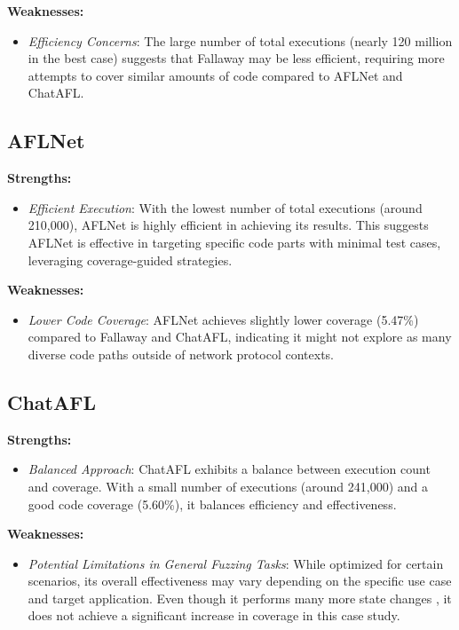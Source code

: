 \textbf{Weaknesses:}
\begin{itemize}
    \item \textit{Efficiency Concerns}: The large number of total executions (nearly 120 million in the best case) suggests that Fallaway may be less efficient, requiring more attempts to cover similar amounts of code compared to AFLNet and ChatAFL.
\end{itemize}


\subsection{AFLNet}

\textbf{Strengths:}
\begin{itemize}
    \item \textit{Efficient Execution}: With the lowest number of total executions (around 210,000), AFLNet is highly efficient in achieving its results. This suggests AFLNet is effective in targeting specific code parts with minimal test cases, leveraging coverage-guided strategies.
\end{itemize}

\textbf{Weaknesses:}
\begin{itemize}
    \item \textit{Lower Code Coverage}: AFLNet achieves slightly lower coverage (5.47\%) compared to Fallaway and ChatAFL, indicating it might not explore as many diverse code paths outside of network protocol contexts.
\end{itemize}

\subsection{ChatAFL}

\textbf{Strengths:}
\begin{itemize}
    \item \textit{Balanced Approach}: ChatAFL exhibits a balance between execution count and coverage. With a small number of executions (around 241,000) and a good code coverage (5.60\%), it balances efficiency and effectiveness.
\end{itemize}

\textbf{Weaknesses:}
\begin{itemize}
    \item \textit{Potential Limitations in General Fuzzing Tasks}: While optimized for certain scenarios, its overall effectiveness may vary depending on the specific use case and target application. Even though it performs many more state changes \cite{chatafl}, it does not achieve a significant increase in coverage in this case study.
\end{itemize}
